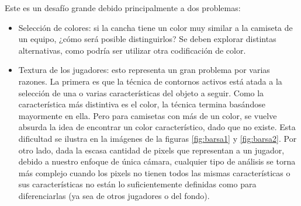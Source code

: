 \documentclass[a4paper,10pt]{article}
\begin{document}
Este es un desafío grande debido principalmente a dos problemas:
\begin{itemize}

\item Selección de colores: si la cancha tiene un color muy similar a la
  camiseta de un equipo, ¿cómo será posible distinguirlos? Se deben explorar
  distintas alternativas, como podría ser utilizar otra codificación de color.

\item Textura de los jugadores: esto representa un gran problema por varias
  razones. La primera es que la técnica de contornos activos está atada a la
  selección de una o varias características del objeto a seguir. Como la
  característica más distintiva es el color, la técnica termina basándose
  mayormente en ella. Pero para camisetas con más de un color, se vuelve
  absurda la idea de encontrar un color característico, dado que no existe.
  Esta dificultad se ilustra en la imágenes de la figuras \ref{fig:barsa1} y
  \ref{fig:barsa2}. Por
  otro lado, dada la escasa cantidad de pixels que representan a un jugador,
  debido a nuestro enfoque de única cámara, cualquier tipo de análisis se torna
  más complejo cuando los pixels no tienen todos las mismas características o
  sus características no están lo suficientemente definidas como para
  diferenciarlas (ya sea de otros jugadores o del fondo).

\end{itemize}
\end{document}
